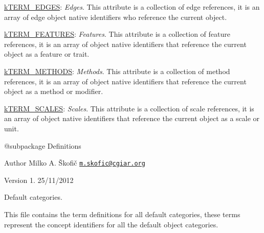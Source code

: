 \begin{DoxyItemize}
\begin{DoxyItemize}
\item {\ttfamily \hyperlink{}{k\-T\-E\-R\-M\-\_\-\-E\-D\-G\-E\-S}}\-: {\itshape Edges}. This attribute is a collection of edge references, it is an array of edge object native identifiers who reference the current object. 
\item {\ttfamily \hyperlink{}{k\-T\-E\-R\-M\-\_\-\-F\-E\-A\-T\-U\-R\-E\-S}}\-: {\itshape Features}. This attribute is a collection of feature references, it is an array of object native identifiers that reference the current object as a feature or trait. 
\item {\ttfamily \hyperlink{}{k\-T\-E\-R\-M\-\_\-\-M\-E\-T\-H\-O\-D\-S}}\-: {\itshape Methods}. This attribute is a collection of method references, it is an array of object native identifiers that reference the current object as a method or modifier. 
\item {\ttfamily \hyperlink{}{k\-T\-E\-R\-M\-\_\-\-S\-C\-A\-L\-E\-S}}\-: {\itshape Scales}. This attribute is a collection of scale references, it is an array of object native identifiers that reference the current object as a scale or unit. 
\end{DoxyItemize}
\end{DoxyItemize}

\begin{DoxyVerb} @subpackage        Definitions
\end{DoxyVerb}


\begin{DoxyAuthor}{Author}
Milko A. Škofič \href{mailto:m.skofic@cgiar.org}{\tt m.\-skofic@cgiar.\-org} 
\end{DoxyAuthor}
\begin{DoxyVersion}{Version}
1. 25/11/2012
\end{DoxyVersion}
Default categories.

This file contains the term definitions for all default categories, these terms represent the concept identifiers for all the default object categories.


